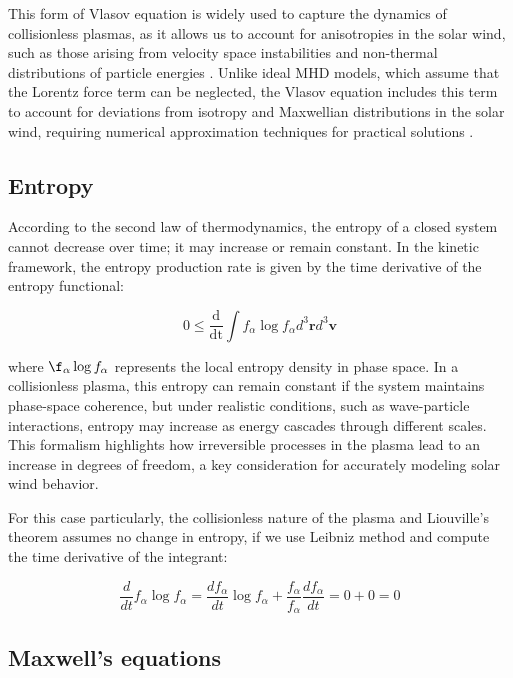 \documentclass[12pt]{article}
\begin{document}
This form of Vlasov equation is widely used to capture the dynamics of collisionless plasmas, as it allows us to account for anisotropies in the solar wind, such as those arising from velocity space instabilities and non-thermal distributions of particle energies \cite{Verscharen_2016}. Unlike ideal MHD models, which assume that the Lorentz force term can be neglected, the Vlasov equation includes this term to account for deviations from isotropy and Maxwellian distributions in the solar wind, requiring numerical approximation techniques for practical solutions \cite{grandin2023hybridvlasovsimulationsoftxray}.

\subsection{Entropy}

According to the second law of thermodynamics, the entropy of a closed system cannot decrease over time; it may increase or remain constant. In the kinetic framework, the entropy production rate is given by the time derivative of the entropy functional:

\begin{equation}
    0 \leq \frac{\mathrm{d}}{\mathrm{dt}} \int f_\alpha \log f_\alpha d^3\mathbf{r} d^3\mathbf{v}
\end{equation}

where $\f_\alpha \log f_\alpha$ represents the local entropy density in phase space. In a collisionless plasma, this entropy can remain constant if the system maintains phase-space coherence, but under realistic conditions, such as wave-particle interactions, entropy may increase as energy cascades through different scales. This formalism highlights how irreversible processes in the plasma lead to an increase in degrees of freedom, a key consideration for accurately modeling solar wind behavior.

For this case particularly, the collisionless nature of the plasma and Liouville's theorem assumes no change in entropy, if we use Leibniz method and compute the time derivative of the integrant:

\begin{equation}
    \frac{d}{dt} f_\alpha \log f_\alpha = \frac{df_\alpha}{dt} \log f_\alpha + \frac{f_\alpha}{f_\alpha}\frac{df_\alpha}{dt} = 0 + 0 = 0
\end{equation}

\subsection{Maxwell's equations}
\end{document}
